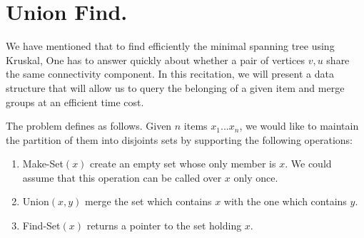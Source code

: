 {}

\def\LinkedList#1{%
  \foreach \element in \list {
    \node[node of list, right = of aux, name=ele] {\element};
    \draw[link] (aux) -- (ele);
    \coordinate (aux) at (ele.east);
  } 
}








\section{Union Find.} 

We have mentioned that to find efficiently the minimal spanning tree using Kruskal, One has to answer quickly about whether a pair of vertices $v,u$ share the same connectivity component. In this recitation, we will present a data structure that will allow us to query the belonging of a given item and merge groups at an efficient time cost. 

The problem defines as follows. Given $n$ items $x_1 ... x_{n}$, we would like to maintain the partition of them into disjoints sets by supporting the following operations:  
\begin{enumerate}
  \item Make-Set$(x)$ create an empty set whose only member is $x$. We could assume that this operation can be called over $x$ only once. 
  \item Union$(x,y)$ merge the set which contains $x$ with the one which contains $y$. 
  \item Find-Set$(x)$ returns a pointer to the set holding $x$. 
\end{enumerate}

